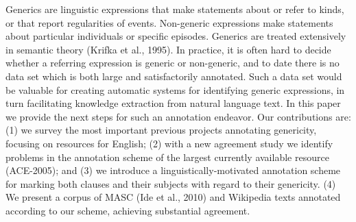 Generics are linguistic expressions that make statements about or refer to kinds, or that report regularities of events. Non-generic expressions make statements about particular individuals or specific episodes. Generics are treated extensively in semantic theory (Krifka et al., 1995). In practice, it is often hard to decide whether a referring expression is generic or non-generic, and to date there is no data set which is both large and satisfactorily annotated. Such a data set would be valuable for creating automatic systems for identifying generic expressions, in turn facilitating knowledge extraction from natural language text. In this paper we provide the next steps for such an annotation endeavor. Our contributions are: (1) we survey the most important previous projects annotating genericity, focusing on resources for English; (2) with a new agreement study we identify problems in the annotation scheme of the largest currently available resource (ACE-2005); and (3) we introduce a linguistically-motivated annotation scheme for marking both clauses and their subjects with regard to their genericity. (4) We present a corpus of MASC (Ide et al., 2010) and Wikipedia texts annotated according to our scheme, achieving substantial agreement.
